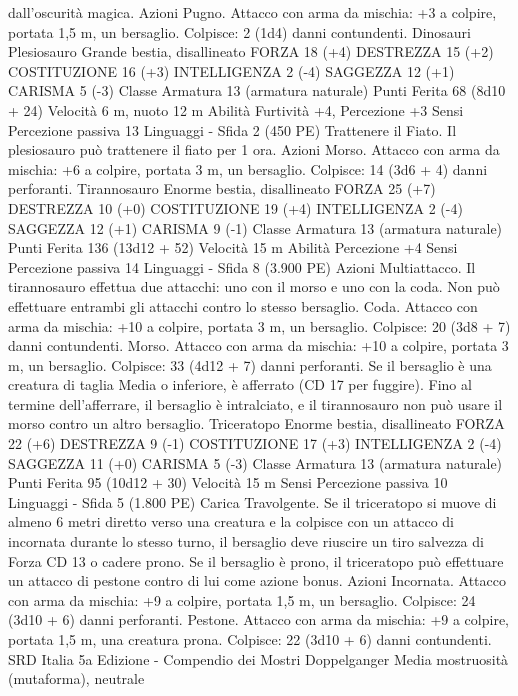 \begin{multicols}{2}
dall’oscurità magica.
Azioni
Pugno. Attacco con arma da mischia: +3 a colpire, portata 1,5
m, un bersaglio.
Colpisce: 2 (1d4) danni contundenti.
Dinosauri
Plesiosauro
Grande bestia, disallineato
FORZA 18 (+4)
DESTREZZA 15 (+2)
COSTITUZIONE 16 (+3)
INTELLIGENZA 2 (-4)
SAGGEZZA 12 (+1)
CARISMA 5 (-3)
Classe Armatura 13 (armatura naturale)
Punti Ferita 68 (8d10 + 24)
Velocità 6 m, nuoto 12 m
Abilità Furtività +4, Percezione +3
Sensi Percezione passiva 13
Linguaggi -
Sfida 2 (450 PE)
Trattenere il Fiato. Il plesiosauro può trattenere il fiato per 1
ora.
Azioni
Morso. Attacco con arma da mischia: +6 a colpire, portata 3 m,
un bersaglio.
Colpisce: 14 (3d6 + 4) danni perforanti.
Tirannosauro
Enorme bestia, disallineato
FORZA 25 (+7)
DESTREZZA 10 (+0)
COSTITUZIONE 19 (+4)
INTELLIGENZA 2 (-4)
SAGGEZZA 12 (+1)
CARISMA 9 (-1)
Classe Armatura 13 (armatura naturale)
Punti Ferita 136 (13d12 + 52)
Velocità 15 m
Abilità Percezione +4
Sensi Percezione passiva 14
Linguaggi -
Sfida 8 (3.900 PE)
Azioni
Multiattacco. Il tirannosauro effettua due attacchi: uno con il
morso e uno con la coda. Non può effettuare entrambi gli
attacchi contro lo stesso bersaglio.
Coda. Attacco con arma da mischia: +10 a colpire, portata 3 m,
un bersaglio.
Colpisce: 20 (3d8 + 7) danni contundenti.
Morso. Attacco con arma da mischia: +10 a colpire, portata 3 m,
un bersaglio.
Colpisce: 33 (4d12 + 7) danni perforanti. Se il bersaglio è una
creatura di taglia Media o inferiore, è afferrato (CD 17 per
fuggire). Fino al termine dell’afferrare, il bersaglio è intralciato,
e il tirannosauro non può usare il morso contro un altro bersaglio.
Triceratopo
Enorme bestia, disallineato
FORZA 22 (+6)
DESTREZZA 9 (-1)
COSTITUZIONE 17 (+3)
INTELLIGENZA 2 (-4)
SAGGEZZA 11 (+0)
CARISMA 5 (-3)
Classe Armatura 13 (armatura naturale)
Punti Ferita 95 (10d12 + 30)
Velocità 15 m
Sensi Percezione passiva 10
Linguaggi -
Sfida 5 (1.800 PE)
Carica Travolgente. Se il triceratopo si muove di almeno 6 metri
diretto verso una creatura e la colpisce con un attacco di
incornata durante lo stesso turno, il bersaglio deve riuscire un
tiro salvezza di Forza CD 13 o cadere prono. Se il bersaglio è
prono, il triceratopo può effettuare un attacco di pestone contro
di lui come azione bonus.
Azioni
Incornata. Attacco con arma da mischia: +9 a colpire, portata
1,5 m, un bersaglio.
Colpisce: 24 (3d10 + 6) danni perforanti.
Pestone. Attacco con arma da mischia: +9 a colpire, portata 1,5
m, una creatura prona.
Colpisce: 22 (3d10 + 6) danni contundenti.
SRD Italia 5a Edizione - Compendio dei Mostri
Doppelganger
Media mostruosità (mutaforma), neutrale

\end{multicols}

